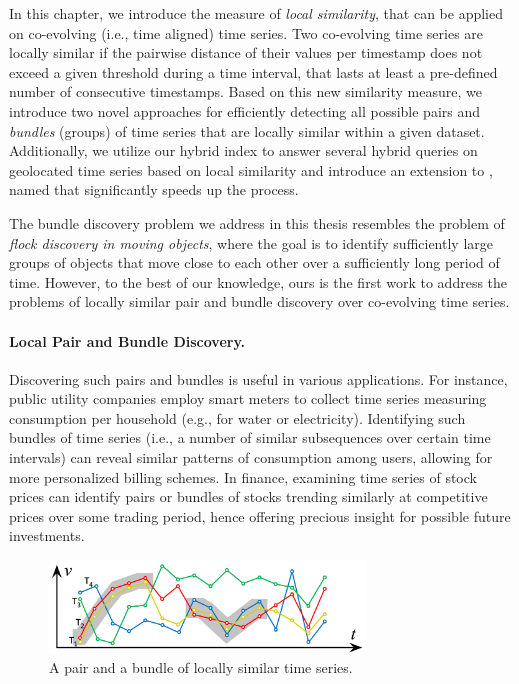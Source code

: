 
\graphicspath{{Papers/SSTD2019/}{Papers/SIGSpatial2019/}}

In this chapter, we introduce the measure of \textit{local similarity}, that can be applied on co-evolving (i.e., time aligned) time series. Two co-evolving time series are locally similar if the pairwise distance of their values per timestamp does not exceed a given threshold during a time interval, that lasts at least a pre-defined number of consecutive timestamps. Based on this new similarity measure, we introduce two novel approaches for efficiently detecting all possible pairs and \textit{bundles} (groups) of time series that are locally similar within a given dataset. Additionally, we utilize our hybrid \btsr index to answer several hybrid queries on geolocated time series based on local similarity and introduce an extension to \btsr, named \sbtsr that significantly speeds up the process.

The bundle discovery problem we address in this thesis resembles the problem of \textit{flock discovery in moving objects}, where the goal is to identify sufficiently large groups of objects that move close to each other over a sufficiently long period of time. However, to the best of our knowledge, ours is the first work to address the problems of locally similar pair and bundle discovery over co-evolving time series. 

\paragraph{Local Pair and Bundle Discovery.} Discovering such pairs and bundles is useful in various applications. For instance, public utility companies employ smart meters to collect time series measuring consumption per household (e.g., for water or electricity). Identifying such bundles of time series (i.e., a number of similar subsequences over certain time intervals) can reveal similar patterns of consumption among users, allowing for more personalized billing schemes. In finance, examining time series of stock prices can identify pairs or bundles of stocks trending similarly at competitive prices over some trading period, hence offering precious insight for possible future investments.

\begin{figure}[!tb]
    \centering
    \includegraphics[width=0.75\textwidth]{figures/pair_flock_ex.png}
    \caption{A pair and a bundle of locally similar time series.}
    \label{fig:pair_flock_ex}
\end{figure}


